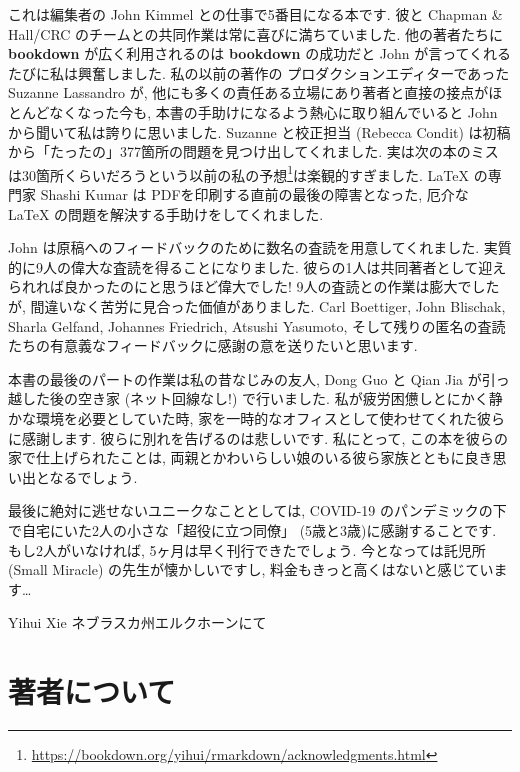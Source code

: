 \documentclass[
  11pt,
  lualatex,ja=standard,jafont=noto]{bxjsreport}
\renewcommand{\href}[2]{#2\footnote{\url{#1}}}
\begin{document}
これは編集者の John Kimmel との仕事で5番目になる本です. 彼と Chapman \& Hall/CRC のチームとの共同作業は常に喜びに満ちていました. 他の著者たちに \textbf{bookdown} が広く利用されるのは \textbf{bookdown} の成功だと John が言ってくれるたびに私は興奮しました. 私の以前の著作の プロダクションエディターであった Suzanne Lassandro が, 他にも多くの責任ある立場にあり著者と直接の接点がほとんどなくなった今も, 本書の手助けになるよう熱心に取り組んでいると John から聞いて私は誇りに思いました. Suzanne と校正担当 (Rebecca Condit) は初稿から「たったの」377箇所の問題を見つけ出してくれました. 実は次の本のミスは30箇所くらいだろうという\href{https://bookdown.org/yihui/rmarkdown/acknowledgments.html}{以前の私の予想}は楽観的すぎました. LaTeX の専門家 Shashi Kumar は PDFを印刷する直前の最後の障害となった, 厄介な LaTeX の問題を解決する手助けをしてくれました.

John は原稿へのフィードバックのために数名の査読を用意してくれました. 実質的に9人の偉大な査読を得ることになりました. 彼らの1人は共同著者として迎えられれば良かったのにと思うほど偉大でした! 9人の査読との作業は膨大でしたが, 間違いなく苦労に見合った価値がありました. Carl Boettiger, John Blischak, Sharla Gelfand, Johannes Friedrich, Atsushi Yasumoto, そして残りの匿名の査読たちの有意義なフィードバックに感謝の意を送りたいと思います.

本書の最後のパートの作業は私の昔なじみの友人, Dong Guo と Qian Jia が引っ越した後の空き家 (ネット回線なし!) で行いました. 私が疲労困憊しとにかく静かな環境を必要としていた時, 家を一時的なオフィスとして使わせてくれた彼らに感謝します. 彼らに別れを告げるのは悲しいです. 私にとって, この本を彼らの家で仕上げられたことは, 両親とかわいらしい娘のいる彼ら家族とともに良き思い出となるでしょう.

最後に絶対に逃せないユニークなこととしては, COVID-19 のパンデミックの下で自宅にいた2人の小さな「超役に立つ同僚」 (5歳と3歳)に感謝することです. もし2人がいなければ, 5ヶ月は早く刊行できたでしょう. 今となっては託児所 (Small Miracle) の先生が懐かしいですし, 料金もきっと高くはないと感じています\ldots{}

\begin{flushright}
Yihui Xie ネブラスカ州エルクホーンにて

\end{flushright}

\hypertarget{author}{%
\chapter*{著者について}\label{author}}
\end{document}
